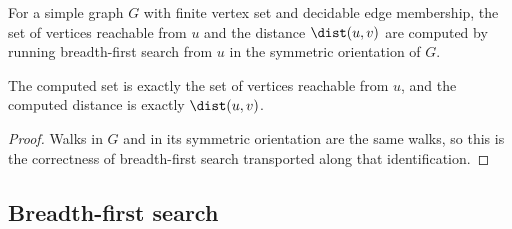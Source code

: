 
%
\begin{definition}
  \label{def:reachable-finset}
  \leanok
  For a simple graph $G$ with finite vertex set and decidable edge membership, the set of
  vertices reachable from $u$ and the distance $\dist(u, v)$ are computed by running
  breadth-first search from $u$ in the symmetric orientation of $G$.
\end{definition}

\begin{theorem}[Correctness]
  \label{thm:reachable-finset-correct}
  \leanok
  The computed set is exactly the set of vertices reachable from $u$, and the computed
  distance is exactly $\dist(u, v)$.
\end{theorem}
\begin{proof}
  \leanok
  Walks in $G$ and in its symmetric orientation are the same walks, so this is the
  correctness of breadth-first search transported along that identification.
\end{proof}


%


%


%


%


%


%
\subsection{Breadth-first search}


